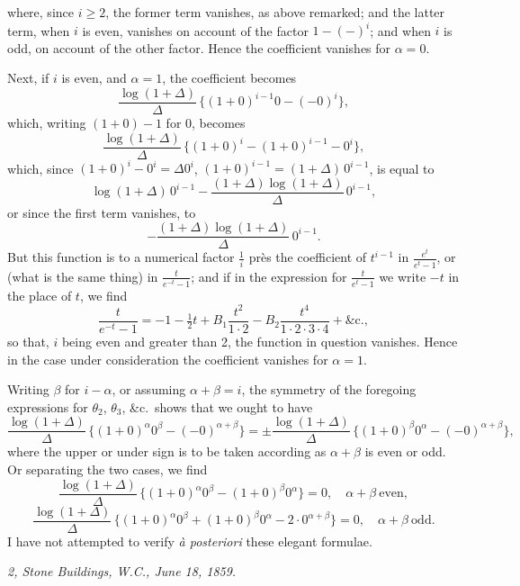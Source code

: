 \documentclass[11pt,a4paper]{article}
\begin{document}
\setcounter{page}{98}

where, since $i \geq 2$, the former term vanishes, as above remarked; and the latter term, when $i$ is even, vanishes on account of the factor $1 - (-)^{i}$; and when $i$ is odd, on account of the other factor. Hence the coefficient vanishes for $\alpha = 0$.

Next, if $i$ is even, and $\alpha = 1$, the coefficient becomes
\[
\frac{\log(1+\Delta)}{\Delta}\,\{(1+0)^{i-1} 0 - (-0)^{i}\},
\]
which, writing $(1 + 0) - 1$ for $0$, becomes
\[
\frac{\log(1+\Delta)}{\Delta}\,\{(1 + 0)^{i} - (1 + 0)^{i-1} - 0^{i}\},
\]
which, since $(1+0)^{i} - 0^{i} = \Delta 0^{i}$, $(1+0)^{i-1} = (1+\Delta)\, 0^{i-1}$, is equal to
\[
\log(1+\Delta)\, 0^{i-1} - \frac{(1+\Delta) \log(1+\Delta)}{\Delta}\, 0^{i-1},
\]
or since the first term vanishes, to
\[
-\frac{(1+\Delta) \log(1+\Delta)}{\Delta}\, 0^{i-1}.
\]
But this function is to a numerical factor $\frac{1}{i}$ près the coefficient of $t^{i-1}$ in $\frac{e^{t}}{e^{t} - 1}$, or (what is the same thing) in $\frac{t}{e^{-t} - 1}$; and if in the expression for $\frac{t}{e^{t} - 1}$ we write $-t$ in the place of $t$, we find
\[
\frac{t}{e^{-t} - 1} = -1 - \tfrac{1}{2}t + B_{1}\frac{t^{2}}{1 \cdot 2} - B_{2}\frac{t^{4}}{1 \cdot 2 \cdot 3 \cdot 4} + \&\mathrm{c.},
\]
so that, $i$ being even and greater than 2, the function in question vanishes. Hence in the case under consideration the coefficient vanishes for $\alpha = 1$.

Writing $\beta$ for $i - \alpha$, or assuming $\alpha + \beta = i$, the symmetry of the foregoing expressions for $\theta_{2}$, $\theta_{3}$, \&c.\ shows that we ought to have
\[
\frac{\log(1+\Delta)}{\Delta}\,\{(1+0)^{\alpha} 0^{\beta} - (-0)^{\alpha + \beta}\} = \pm \frac{\log(1+\Delta)}{\Delta}\,\{(1+0)^{\beta} 0^{\alpha} - (-0)^{\alpha + \beta}\},
\]
where the upper or under sign is to be taken according as $\alpha + \beta$ is even or odd. Or separating the two cases, we find
\[
\frac{\log(1+\Delta)}{\Delta}\,\{(1+0)^{\alpha} 0^{\beta} - (1+0)^{\beta} 0^{\alpha}\} = 0,\quad \alpha+\beta\ \text{even},
\]
\[
\frac{\log(1+\Delta)}{\Delta}\,\{(1+0)^{\alpha} 0^{\beta} + (1+0)^{\beta} 0^{\alpha} - 2 \cdot 0^{\alpha + \beta}\} = 0,\quad \alpha+\beta\ \text{odd}.
\]
I have not attempted to verify \textit{à posteriori} these elegant formulae.

\medskip
\noindent\textit{2, Stone Buildings, W.C., June 18, 1859.}

\newpage

\end{document}
